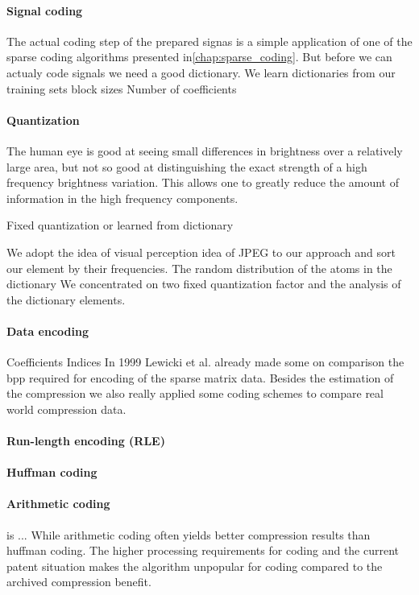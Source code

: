 \paragraph{Signal coding}
The actual coding step of the prepared signas is a simple application of one
of the sparse coding algorithms presented in\ref{chap:sparse_coding}.
But before we can actualy code signals we need a good dictionary.
We learn dictionaries from our training sets 
block sizes
Number of coefficients


\paragraph{Quantization}
The human eye is good at seeing small differences in brightness over a
relatively large area, but not so good at distinguishing the exact strength of a
high frequency brightness variation. This allows one to greatly reduce the
amount of information in the high frequency components. 

Fixed quantization or learned from dictionary

We adopt the idea of visual perception idea of JPEG to our
approach and sort our element by their frequencies.
The random distribution of the atoms in the dictionary 
We concentrated on two fixed quantization factor and the analysis of the
dictionary elements.



\paragraph{Data encoding}

Coefficients
Indices
In 1999 Lewicki et al.\cite{Lewicki1999} already made some on comparison 
the bpp required for encoding of the sparse matrix data. Besides the estimation
of the compression we also really applied some coding schemes to compare real
world compression data.
\cite{Murray2006}

\paragraph{Run-length encoding (RLE)}
\paragraph{Huffman coding}
\paragraph{Arithmetic coding} is ...
While arithmetic coding often yields better compression results than huffman
coding. The higher processing requirements for coding and the current patent
situation makes the algorithm unpopular for coding compared to the archived
compression benefit.

